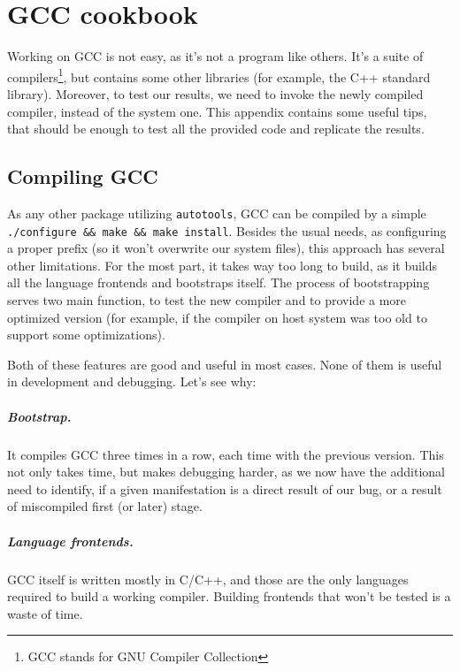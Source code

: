 \appendix
\chapter{GCC cookbook}

Working on GCC is not easy, as it's not a program like others. It's a suite of
compilers\footnote{GCC stands for GNU Compiler Collection}, but contains some
other libraries (for example, the C++ standard library). Moreover, to test our
results, we need to invoke the newly compiled compiler, instead of the system
one. This appendix contains some useful tips, that should be enough to test all
the provided code and replicate the results.

\section{Compiling GCC}

As any other package utilizing {\tt autotools}, GCC can be compiled by a simple
{\tt ./configure \&\& make \&\& make install}. Besides the usual needs, as
configuring a proper prefix (so it won't overwrite our system files), this
approach has several other limitations. For the most part, it takes way too
long to build, as it builds all the language frontends and bootstraps itself.
The process of bootstrapping serves two main function, to test the new compiler
and to provide a more optimized version (for example, if the compiler on host
system was too old to support some optimizations).

Both of these features are good and useful in most cases. None of them is
useful in development and debugging. Let's see why:

\paragraph{Bootstrap.} It compiles GCC three times in a row, each time with the
previous version. This not only takes time, but makes debugging harder, as we
now have the additional need to identify, if a given manifestation is a direct
result of our bug, or a result of miscompiled first (or later) stage.

\paragraph{Language frontends.} GCC itself is written mostly in C/C++, and
those are the only languages required to build a working compiler. Building
frontends that won't be tested is a waste of time.

